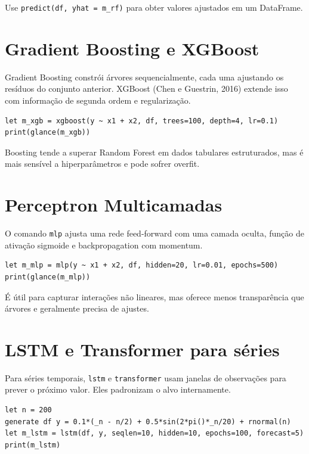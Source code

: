 Use \texttt{predict(df, yhat = m\_rf)} para obter valores ajustados em um
DataFrame.

\section{Gradient Boosting e XGBoost}

Gradient Boosting constrói árvores sequencialmente, cada uma ajustando
os resíduos do conjunto anterior. XGBoost (Chen e Guestrin, 2016)
extende isso com informação de segunda ordem e regularização.

\begin{lstlisting}[caption={Regressão com XGBoost}]
let m_xgb = xgboost(y ~ x1 + x2, df, trees=100, depth=4, lr=0.1)
print(glance(m_xgb))
\end{lstlisting}

Boosting tende a superar Random Forest em dados tabulares estruturados,
mas é mais sensível a hiperparâmetros e pode sofrer overfit.

\section{Perceptron Multicamadas}

O comando \texttt{mlp} ajusta uma rede feed-forward com uma camada oculta,
função de ativação sigmoide e backpropagation com momentum.

\begin{lstlisting}[caption={Rede neural}]
let m_mlp = mlp(y ~ x1 + x2, df, hidden=20, lr=0.01, epochs=500)
print(glance(m_mlp))
\end{lstlisting}

É útil para capturar interações não lineares, mas oferece menos
transparência que árvores e geralmente precisa de ajustes.

\section{LSTM e Transformer para séries}

Para séries temporais, \texttt{lstm} e \texttt{transformer} usam janelas de
observações para prever o próximo valor. Eles padronizam o alvo
internamente.

\begin{lstlisting}[caption={Previsão com LSTM}]
let n = 200
generate df y = 0.1*(_n - n/2) + 0.5*sin(2*pi()*_n/20) + rnormal(n)
let m_lstm = lstm(df, y, seqlen=10, hidden=10, epochs=100, forecast=5)
print(m_lstm)
\end{lstlisting}


